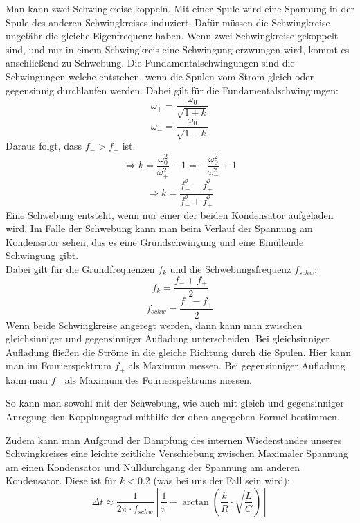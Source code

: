 \documentclass[twoside]{protokoll}
\begin{document}
Man kann zwei Schwingkreise koppeln. Mit einer Spule wird eine Spannung in der Spule des anderen Schwingkreises induziert.
Dafür müssen die Schwingkreise ungefähr die gleiche Eigenfrequenz haben.
Wenn zwei Schwingkreise gekoppelt sind, und nur in einem Schwingkreis eine Schwingung erzwungen wird, kommt es anschließend zu Schwebung.
Die Fundamentalschwingungen sind die Schwingungen welche entstehen, wenn die Spulen vom Strom gleich oder gegensinnig durchlaufen werden.
Dabei gilt für die Fundamentalschwingungen:
\begin{equation}
    \omega_+ = \frac{\omega_0}{\sqrt{1 + k}}
\end{equation}
\begin{equation}
    \omega_- = \frac{\omega_0}{\sqrt{1 - k}}
\end{equation}
Daraus folgt, dass $f_- > f_+$ ist.
\begin{equation}
    \Rightarrow k = \frac{\omega_0^2}{\omega_+^2} - 1 = - \frac{\omega_0^2}{\omega_-^2} + 1
\end{equation}
\begin{equation}
    \Rightarrow k = \frac{f_-^2 - f_+^2}{f_-^2 + f_+^2}
\end{equation}
Eine Schwebung entsteht, wenn nur einer der beiden Kondensator aufgeladen wird.
Im Falle der Schwebung kann man beim Verlauf der Spannung am Kondensator sehen, das es eine Grundschwingung und eine Einüllende Schwingung gibt. \\
Dabei gilt für die Grundfrequenzen $f_k$ und die Schwebungsfrequenz $f_{schw}$:
\begin{equation}
    f_k = \frac{f_- + f_+}{2}
\end{equation}
\begin{equation}
    f_{schw} = \frac{f_- - f_+}{2}
\end{equation}
Wenn beide Schwingkreise angeregt werden, dann kann man zwischen gleichsinniger und gegensinniger Aufladung unterscheiden.
Bei gleichsinniger Aufladung fließen die Ströme in die gleiche Richtung durch die Spulen.
Hier kann man im Fourierspektrum $f_+$ als Maximum messen.
Bei gegensinniger Aufladung kann man $f_-$ als Maximum des Fourierspektrums messen.

So kann man sowohl mit der Schwebung, wie auch mit gleich und gegensinniger Anregung den Kopplungsgrad mithilfe der oben angegeben Formel bestimmen.

Zudem kann man Aufgrund der Dämpfung des internen Wiederstandes unseres Schwingkreises eine leichte zeitliche Verschiebung zwischen Maximaler Spannung am einen Kondensator und Nulldurchgang der Spannung am anderen Kondensator.
Diese ist für $ k < 0.2$ (was bei uns der Fall sein wird):
\begin{equation}
    \Delta t \approx \frac{1}{2 \pi \cdot f_{schw}} \left[ \frac{1}{\pi} - \arctan{\left( \frac{k}{R} \cdot \sqrt{\frac{L}{C}} \right)} \right]
   \label{DeltaT}
\end{equation}
\end{document}
